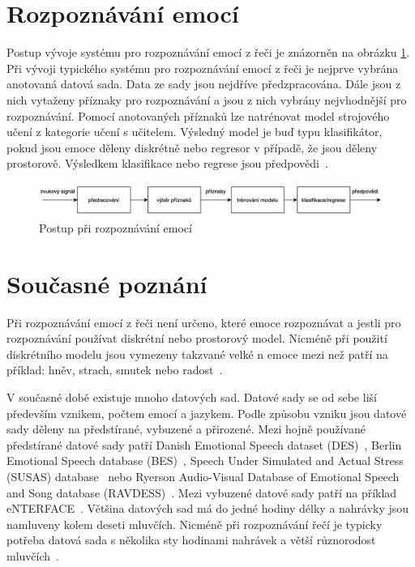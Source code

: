 \documentclass[FM,BP]{tulthesis}
\newcommand{\note}[1]{\todo[color=blue!40]{#1}}
\begin{document}
\section{Rozpoznávání emocí} %
Postup vývoje systému pro rozpoznávání emocí z řeči je znázorněn na obrázku \ref{fig:ser_pipeline}. Při vývoji typického systému pro rozpoznávání emocí z řeči je nejprve vybrána anotovaná datová sada. Data ze sady jsou nejdříve předzpracována. Dále jsou z nich vytaženy příznaky pro rozpoznávání a jsou z nich vybrány nejvhodnější pro rozpoznávání. Pomocí anotovaných příznaků lze natrénovat model strojového učení z kategorie učení s učitelem. Výsledný model je buď typu klasifikátor, pokud jsou emoce děleny diskrétně nebo regresor v případě, že jsou děleny prostorově. Výsledkem klasifikace nebo regrese jsou předpovědi~\cite{konar_chakraborty_2015}.

\begin{figure}[htbp]
\centerline{\includegraphics[width=\textwidth,height=\textheight,keepaspectratio]{speech_emotion_recognition-pipeline.png}}
\caption{Postup při rozpoznávání emocí}
\label{fig:ser_pipeline}
\end{figure}
\FloatBarrier

\section{Současné poznání}
Při rozpoznávání emocí z řeči není určeno, které emoce rozpoznávat a jestli pro rozpoznávání používat diskrétní nebo prostorový model. Nicméně při použití diskrétního modelu jsou vymezeny takzvané velké n emoce mezi než patří na příklad: hněv, strach, smutek nebo radost~\cite{konar_chakraborty_2015}. \note{velké n?}

V současné době existuje mnoho datových sad. Datové sady se od sebe liší především vznikem, počtem emocí a jazykem. Podle způsobu vzniku jsou datové sady děleny na předstírané, vybuzené a přirozené. Mezi hojně používané předstírané datové sady patří Danish Emotional Speech dataset (DES)~\cite{DBLP:conf/interspeech/EngbergHAD97}, Berlin Emotional Speech database (BES)~\cite{bes_dataset}, Speech Under Simulated and Actual Stress (SUSAS) database~\cite{DBLP:conf/interspeech/HansenB97} nebo Ryerson Audio-Visual Database of Emotional Speech and Song database (RAVDESS)~\cite{Livingstone2018}. Mezi vybuzené datové sady patří na příklad eNTERFACE~\cite{DBLP:conf/icde/MartinKMP06}. Většina datových sad má do jedné hodiny délky a nahrávky jsou namluveny kolem deseti mluvčích. Nicméně při rozpoznávání řečí je typicky potřeba datová sada s několika sty hodinami nahrávek a větší různorodost mluvčích~\cite{konar_chakraborty_2015}. \note{rozpoznávání řečí? jako jazyků?}
\end{document}
